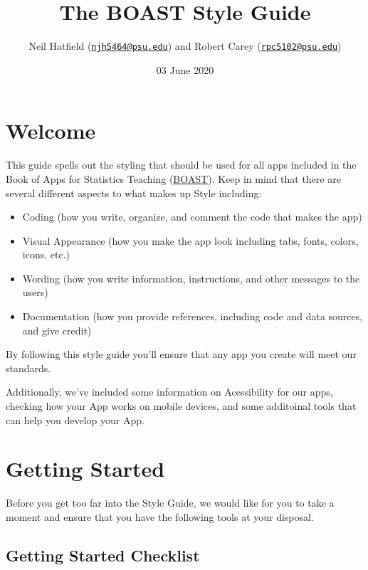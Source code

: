 \documentclass[
]{book}
\title{The BOAST Style Guide}
\author{Neil Hatfield (\href{mailto:njh5464@psu.edu}{\nolinkurl{njh5464@psu.edu}}) and Robert Carey (\href{mailto:rpc5102@psu.edu}{\nolinkurl{rpc5102@psu.edu}})}
\date{03 June 2020}
\providecommand{\tightlist}{%
  \setlength{\itemsep}{0pt}\setlength{\parskip}{0pt}}
\begin{document}
\maketitle

{
\setcounter{tocdepth}{1}
\tableofcontents
}
\hypertarget{welcome}{%
\chapter*{Welcome}\label{welcome}}

This guide spells out the styling that should be used for all apps included in the Book of Apps for Statistics Teaching (\href{https://github.com/EducationShinyAppTeam/BOAST}{BOAST}). Keep in mind that there are several different aspects to what makes up Style including:

\begin{itemize}
\tightlist
\item
  Coding (how you write, organize, and comment the code that makes the app)
\item
  Visual Appearance (how you make the app look including tabs, fonts, colors, icons, etc.)
\item
  Wording (how you write information, instructions, and other messages to the users)
\item
  Documentation (how you provide references, including code and data sources, and give credit)
\end{itemize}

By following this style guide you'll ensure that any app you create will meet our standards.

Additionally, we've included some information on Acessibility for our apps, checking how your App works on mobile devices, and some additoinal tools that can help you develop your App.

\setcounter{chapter}{0}

\hypertarget{getStarted}{%
\chapter{Getting Started}\label{getStarted}}

Before you get too far into the Style Guide, we would like for you to take a moment and ensure that you have the following tools at your disposal.

\hypertarget{checklist}{%
\section{Getting Started Checklist}\label{checklist}}
\end{document}
